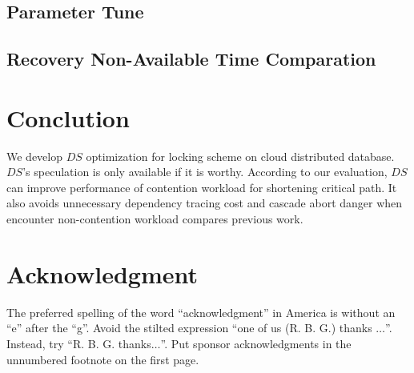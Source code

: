 \documentclass[conference]{IEEEtran}
\begin{document}
\subsection{Parameter Tune}

\subsection{Recovery Non-Available Time Comparation}

\section{Conclution}
\label{sec:conclution}
We develop $DS$ optimization for locking scheme on cloud distributed database.
${DS}$'s speculation is only available if it is worthy.
According to our evaluation, ${DS}$ can improve performance of contention workload for shortening critical path.
It also avoids unnecessary dependency tracing cost and cascade abort danger when encounter non-contention workload compares previous work.




\section*{Acknowledgment}

The preferred spelling of the word ``acknowledgment'' in America is without 
an ``e'' after the ``g''. Avoid the stilted expression ``one of us (R. B. 
G.) thanks $\ldots$''. Instead, try ``R. B. G. thanks$\ldots$''. Put sponsor 
acknowledgments in the unnumbered footnote on the first page.






\end{document}

